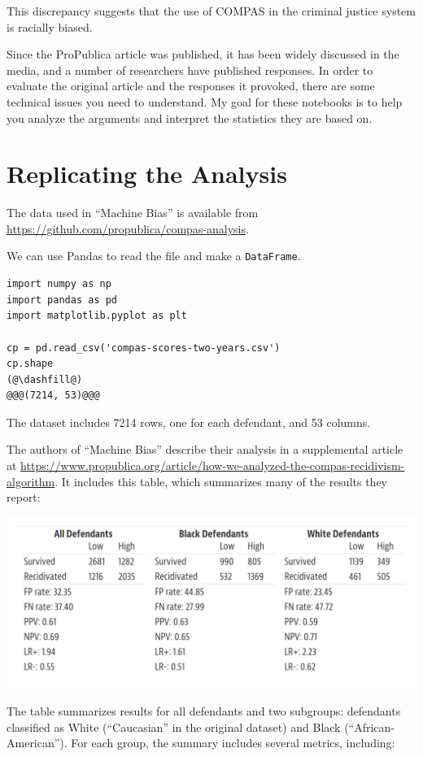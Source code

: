 This discrepancy suggests that the use of COMPAS in the criminal justice
system is racially biased.

Since the ProPublica article was published, it has been widely discussed
in the media, and a number of researchers have published responses. In
order to evaluate the original article and the responses it provoked,
there are some technical issues you need to understand. My goal for
these notebooks is to help you analyze the arguments and interpret the
statistics they are based on.

\hypertarget{replicating-the-analysis}{%
\section{Replicating the Analysis}\label{replicating-the-analysis}}

The data used in ``Machine Bias'' is available from
\url{https://github.com/propublica/compas-analysis}.

We can use Pandas to read the file and make a
\passthrough{\lstinline!DataFrame!}.

\begin{lstlisting}[]
import numpy as np
import pandas as pd
import matplotlib.pyplot as plt

cp = pd.read_csv('compas-scores-two-years.csv')
cp.shape
(@\dashfill@)
@@@(7214, 53)@@@
\end{lstlisting}

The dataset includes 7214 rows, one for each defendant, and 53 columns.

The authors of ``Machine Bias'' describe their analysis in a
supplemental article at
\url{https://www.propublica.org/article/how-we-analyzed-the-compas-recidivism-algorithm}.
It includes this table, which summarizes many of the results they
report:

\includegraphics{chapters/figs/machine_bias_table.png}

The table summarizes results for all defendants and two subgroups:
defendants classified as White (``Caucasian'' in the original dataset)
and Black (``African-American''). For each group, the summary includes
several metrics, including:

